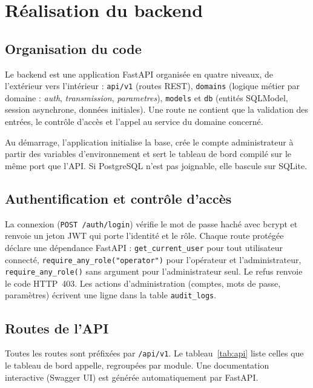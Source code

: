 \section{Réalisation du backend}

\subsection{Organisation du code}

Le backend est une application FastAPI organisée en quatre niveaux, de
l'extérieur vers l'intérieur : \texttt{api/v1} (routes REST), \texttt{domains}
(logique métier par domaine : \textit{auth}, \textit{transmission},
\textit{parametres}), \texttt{models} et \texttt{db} (entités SQLModel, session
asynchrone, données initiales). Une route ne contient que la validation des
entrées, le contrôle d'accès et l'appel au service du domaine concerné.

Au démarrage, l'application initialise la base, crée le compte administrateur
à partir des variables d'environnement et sert le tableau de bord compilé sur
le même port que l'API. Si PostgreSQL n'est pas joignable, elle bascule sur
SQLite.

\subsection{Authentification et contrôle d'accès}

La connexion (\texttt{POST /auth/login}) vérifie le mot de passe haché avec
bcrypt et renvoie un jeton JWT qui porte l'identité et le rôle. Chaque route
protégée déclare une dépendance FastAPI : \texttt{get\_current\_user} pour tout
utilisateur connecté, \texttt{require\_any\_role("operator")} pour l'opérateur
et l'administrateur, \texttt{require\_any\_role()} sans argument pour
l'administrateur seul. Le refus renvoie le code HTTP~403. Les actions
d'administration (comptes, mots de passe, paramètres) écrivent une ligne dans
la table \texttt{audit\_logs}.

\subsection{Routes de l'API}

Toutes les routes sont préfixées par \texttt{/api/v1}. Le
tableau~\ref{tab:api} liste celles que le tableau de bord appelle,
regroupées par module. Une documentation interactive (Swagger UI) est
générée automatiquement par FastAPI.

